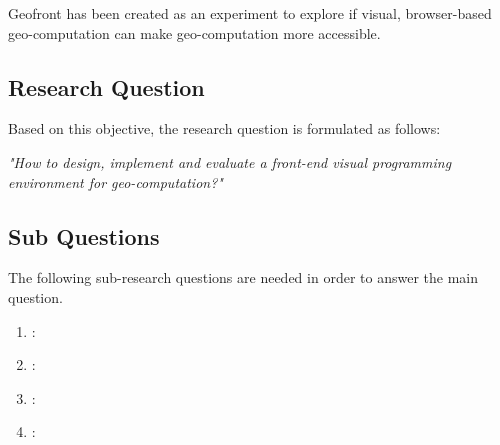 Geofront has been created as an experiment to explore if visual, browser-based geo-computation can make geo-computation more accessible. 






\newpage
\subsection{Research Question}
Based on this objective, the research question is formulated as follows: 

\textit{"How to design, implement and evaluate a front-end visual programming environment for geo-computation?"}

\subsection*{Sub Questions}
The following sub-research questions are needed in order to answer the main question. 

\begin{enumerate}[a]
  \item {}: 
  \item {}:   
  \item {}: 
  \item {}:  
\end{enumerate}



